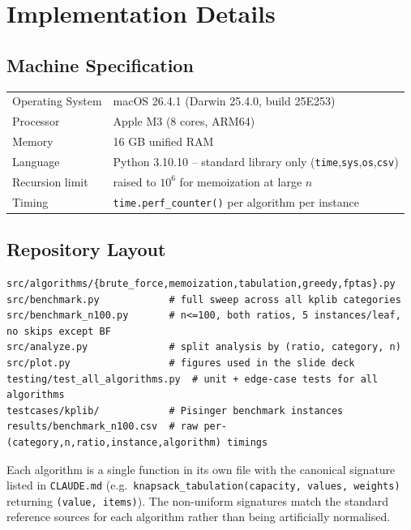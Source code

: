 \documentclass[11pt, a4paper]{article}
\begin{document}
\section{Implementation Details}

\subsection{Machine Specification}
\begin{table}[H]
\centering
\small
\begin{tabular}{@{}ll@{}}
\toprule
Operating System  & macOS 26.4.1 (Darwin 25.4.0, build 25E253) \\
Processor         & Apple M3 (8 cores, ARM64) \\
Memory            & 16 GB unified RAM \\
Language          & Python 3.10.10 -- standard library only (\texttt{time},\texttt{sys},\texttt{os},\texttt{csv}) \\
Recursion limit   & raised to $10^6$ for memoization at large $n$ \\
Timing            & \texttt{time.perf\_counter()} per algorithm per instance \\
\bottomrule
\end{tabular}
\end{table}

\subsection{Repository Layout}
\begin{lstlisting}[style=plain]
src/algorithms/{brute_force,memoization,tabulation,greedy,fptas}.py
src/benchmark.py            # full sweep across all kplib categories
src/benchmark_n100.py       # n<=100, both ratios, 5 instances/leaf, no skips except BF
src/analyze.py              # split analysis by (ratio, category, n)
src/plot.py                 # figures used in the slide deck
testing/test_all_algorithms.py  # unit + edge-case tests for all algorithms
testcases/kplib/            # Pisinger benchmark instances
results/benchmark_n100.csv  # raw per-(category,n,ratio,instance,algorithm) timings
\end{lstlisting}

Each algorithm is a single function in its own file with the canonical signature
listed in \texttt{CLAUDE.md} (e.g.\ \texttt{knapsack\_tabulation(capacity,
values, weights)} returning \texttt{(value, items)}). The non-uniform signatures
match the standard reference sources for each algorithm rather than being
artificially normalised.
\end{document}
